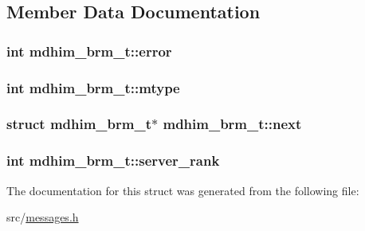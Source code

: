 \subsection{Member Data Documentation}
\hypertarget{structmdhim__brm__t_ae52738aa96be251a3565ba89b11364f4}{
\subsubsection[{error}]{\setlength{\rightskip}{0pt plus 5cm}int mdhim\-\_\-brm\-\_\-t\-::error}}\label{structmdhim__brm__t_ae52738aa96be251a3565ba89b11364f4}
\hypertarget{structmdhim__brm__t_abec78e9a1df09e0c2895c51edcacf59e}{
\subsubsection[{mtype}]{\setlength{\rightskip}{0pt plus 5cm}int mdhim\-\_\-brm\-\_\-t\-::mtype}}\label{structmdhim__brm__t_abec78e9a1df09e0c2895c51edcacf59e}
\hypertarget{structmdhim__brm__t_ae3a86c1cd3f91266fccf3a90dd5798d5}{
\subsubsection[{next}]{\setlength{\rightskip}{0pt plus 5cm}struct {\bf mdhim\-\_\-brm\-\_\-t}$\ast$ mdhim\-\_\-brm\-\_\-t\-::next}}\label{structmdhim__brm__t_ae3a86c1cd3f91266fccf3a90dd5798d5}
\hypertarget{structmdhim__brm__t_a909ab473a5cde03aac89c5ef6aabc7cd}{
\subsubsection[{server\-\_\-rank}]{\setlength{\rightskip}{0pt plus 5cm}int mdhim\-\_\-brm\-\_\-t\-::server\-\_\-rank}}\label{structmdhim__brm__t_a909ab473a5cde03aac89c5ef6aabc7cd}


The documentation for this struct was generated from the following file\-:\begin{DoxyCompactItemize}
\item 
src/\hyperlink{messages_8h}{messages.\-h}\end{DoxyCompactItemize}
